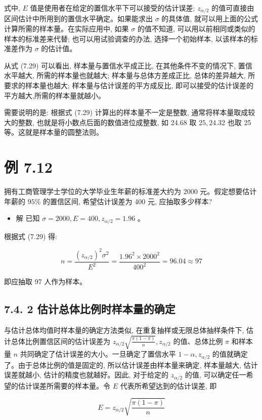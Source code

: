 \documentclass[10pt]{article}
\begin{document}
\begin{CJK*}{UTF8}{bsmi}
式中, $E$ 值是使用者在给定的置信水平下可以接受的估计误差; $z_{\alpha / 2}$ 的值可直接由区间估计中所用到的置信水平确定。如果能求出 $\sigma$ 的具体值, 就可以用上面的公式计算所需的样本量。在实际应用中, 如果 $\sigma$ 的值不知道, 可以用以前相同或类似的样本的标准差来代替; 也可以用试验调查的办法, 选择一个初始样本, 以该样本的标准差作为 $\sigma$ 的估计值。

从式 (7.29) 可以看出, 样本量与置信水平成正比, 在其他条件不变的情况下, 置信水平越大, 所需的样本量也就越大; 样本量与总体方差成正比, 总体的差异越大, 所要求的样本量也越大; 样本量与估计误差的平方成反比, 即可以接受的估计误差的平方越大,所需的样本量就越小。

需要说明的是: 根据式 (7.29) 计算出的样本量不一定是整数, 通常将样本量取成较大的整数, 也就是将小数点后面的数值进位成整数, 如 24.68 取 $25,24.32$ 也取 25 等。这就是样本量的圆整法则。

\section*{例 7.12}
拥有工商管理学士学位的大学毕业生年薪的标准差大约为 2000 元。假定想要估计年薪的 $95 \%$ 的置信区间, 希望估计误差为 400 元, 应抽取多少样本?

\begin{itemize}
  \item 解 已知 $\sigma=2000, E=400, z_{\alpha / 2}=1.96$ 。
\end{itemize}

根据式 (7.29) 得:

$$
n=\frac{\left(z_{\alpha / 2}\right)^{2} \sigma^{2}}{E^{2}}=\frac{1.96^{2} \times 2000^{2}}{400^{2}}=96.04 \approx 97
$$

即应抽取 97 人作为样本。

\subsection*{7.4. 2 估计总体比例时样本量的确定}
与估计总体均值时样本量的确定方法类似, 在重复抽样或无限总体抽样条件下, 估计总体比例置信区间的估计误差为 $z_{\alpha / 2} \sqrt{\frac{\pi(1-\pi)}{n}}, z_{\alpha / 2}$ 的值、总体比例 $\pi$ 和样本量 $n$ 共同确定了估计误差的大小。一旦确定了置信水平 $1-\alpha, z_{\alpha / 2}$ 的值就确定了。由于总体比例的值是固定的, 所以估计误差由样本量来确定, 样本量越大, 估计误差就越小, 估计的精度也就越好。因此, 对于给定的 $z_{\alpha / 2}$ 的值, 可以确定任一希望的估计误差所需要的样本量。令 $E$ 代表所希望达到的估计误差, 即


\begin{equation*}
E=z_{\alpha / 2} \sqrt{\frac{\pi(1-\pi)}{n}} \tag{7.30}
\end{equation*}



\end{CJK*}
\end{document}
